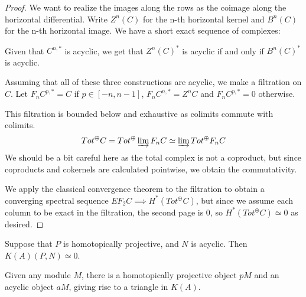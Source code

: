 \documentclass[../thesis.tex]{subfiles}
\begin{document}
            \begin{proof}
                We want to realize the images along the rows as the coimage along the horizontal differential. Write $Z^n(C)$ for the n-th horizontal kernel and $B^n(C)$ for the n-th horizontal image. We have a short exact sequence of complexes:

                \begin{center}
                \end{center}

                Given that $C^{n,*}$ is acyclic, we get that $Z^n(C)^*$ is acyclic if and only if $B^n(C)^*$ is acyclic.

                Assuming that all of these three constructions are acyclic, we make a filtration on $C$. Let $F_nC^{p,*} = C$ if $p \in [-n, n-1]$, $F_nC^{n,*} = Z^nC$ and $F_nC^{p,*} = 0$ otherwise.

                This filtration is bounded below and exhaustive as colimits commute with colimits.
                \begin{align*}
                    Tot^\oplus C = Tot^\oplus \varinjlim F_nC \simeq \varinjlim Tot^\oplus F_nC
                \end{align*}
                We should be a bit careful here as the total complex is not a coproduct, but since coproducts and cokernels are calculated pointwise, we obtain the commutativity.

                We apply the classical convergence theorem to the filtration to obtain a converging spectral sequence $EF_2C \implies H^*(Tot^\oplus C)$, but since we assume each column to be exact in the filtration, the second page is $0$, so $H^*(Tot^\oplus C) \simeq 0$ as desired. 
            \end{proof}

            \begin{thm}
                Suppose that $P$ is homotopically projective, and $N$ is acyclic. Then $K(A)(P, N)\simeq 0$.

                Given any module $M$, there is a homotopically projective object $pM$ and an acyclic object $aM$, giving rise to a triangle in $K(A)$.
                \begin{center}
                \end{center}
            \end{thm}
\end{document}
